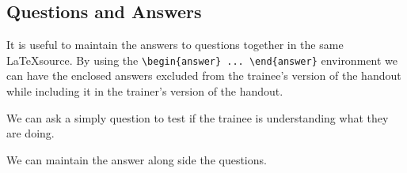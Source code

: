 %
%
%
%





\subsection{Questions and Answers}

It is useful to maintain the answers to questions together in the same \LaTeX source. By using the
\verb+\begin{answer} ... \end{answer}+ environment we can have the enclosed answers excluded from
the trainee's version of the handout while including it in the trainer's version of the handout.

\begin{questions}
We can ask a simply question to test if the trainee is understanding what they are doing.
\begin{answer}
We can maintain the answer along side the questions.
\end{answer}

\end{questions}

